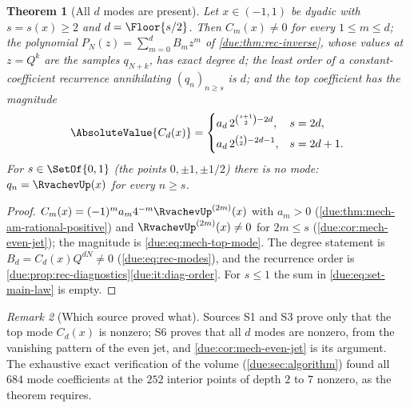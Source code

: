 \documentclass[11pt,oneside]{article}
\theoremstyle{plain}
\newtheorem{theorem}{Theorem}[section]
\theoremstyle{definition}
\theoremstyle{remark}
\newtheorem{remark}[theorem]{Remark}
\newcommand{\upn}[1]{\RvachevUp_{#1}}
\newcommand{\dep}[1]{s\!\left(#1\right)}                    %
\newcommand{\Qq}{Q}                                         %
\newcommand{\am}[1]{a_{#1}}                                 %
\newcommand{\Cr}[2]{C_{#1}\!\left(#2\right)}                %
\newcommand{\qn}[1]{q_{#1}}                                 %
\begin{document}
\begin{theorem}[All $d$ modes are present]
\label{due:thm:sharp-modes}
Let $x\in(-1,1)$ be dyadic with $s=\dep{x}\ge2$ and $d=\Floor{s/2}$.  Then
$\Cr{m}{x}\ne0$ for every $1\le m\le d$; the polynomial
$P_{N}(z)=\sum_{m=0}^{d}B_{m}z^{m}$ of \cref{due:thm:rec-inverse}, whose
values at $z=\Qq^{k}$ are the samples $\qn{N+k}$, has exact degree $d$; the
least order of a constant-coefficient recurrence annihilating
$(\qn{n})_{n\ge s}$ is $d$; and the top coefficient has the magnitude
\begin{equation}
 \AbsoluteValue{\Cr{d}{x}}
 =\begin{cases}
  \am{d}\,2^{\binom{s+1}{2}-2d}, & s=2d,\\[0.3em]
  \am{d}\,2^{\binom{s}{2}-2d-1}, & s=2d+1.
 \end{cases}
 \label{due:eq:sharp-top-mode}
\end{equation}
For $s\in\SetOf{0,1}$ (the points $0,\pm1,\pm1/2$) there is no mode:
$\qn{n}=\RvachevUp(x)$ for every $n\ge s$.
\end{theorem}

\begin{proof}
$\Cr{m}{x}=(-1)^{m}\am{m}4^{-m}\RvachevUp^{(2m)}(x)$ with $\am{m}>0$
(\cref{due:thm:mech-am-rational-positive}) and $\RvachevUp^{(2m)}(x)\ne0$
for $2m\le s$ (\cref{due:cor:mech-even-jet}); the magnitude is
\cref{due:eq:mech-top-mode}.  The degree statement is $B_{d}=\Cr{d}{x}\Qq^{dN}\ne0$
(\cref{due:eq:rec-modes}), and the recurrence order is
\cref{due:prop:rec-diagnostics}\ref{due:it:diag-order}.  For $s\le1$ the
sum in \cref{due:eq:set-main-law} is empty.
\end{proof}

\begin{remark}[Which source proved what]
\label{due:rmk:sharp-modes-sources}
Sources S1 and S3 prove only that the top mode $\Cr{d}{x}$ is nonzero;
S6 proves that all $d$ modes are nonzero, from the vanishing pattern of the
even jet, and \cref{due:cor:mech-even-jet} is its argument.  The exhaustive
exact verification of the volume (\cref{due:sec:algorithm}) found all
$684$ mode coefficients at the $252$ interior points of depth $2$ to $7$
nonzero, as the theorem requires.
\end{remark}
\end{document}

